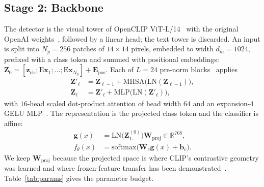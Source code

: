 \documentclass[10pt,journal]{IEEEtran}
\newcommand{\vect}[1]{\boldsymbol{#1}}
\newcommand{\mat}[1]{\mathbf{#1}}
\newcommand{\real}{\mathbb{R}}
\begin{document}
\subsection{Stage 2: Backbone}\label{sec:arch}
The detector is the visual tower of OpenCLIP ViT-L/14~\cite{ilharco2021openclip}
with the original OpenAI weights~\cite{radford2021clip}, followed by a linear
head; the text tower is discarded. An input is split into $N_p=256$ patches of
$14\times14$ pixels, embedded to width $d_m=1024$, prefixed with a class token
and summed with positional embeddings:
$\mat{Z}_0=[\vect{z}_{\mathrm{cls}};\mathrm{E}\vect{x}_1;\dots;\mathrm{E}\vect{x}_{N_p}]
+\mat{E}_{\mathrm{pos}}$. Each of $L=24$ pre-norm
blocks~\cite{vaswani2017attention,dosovitskiy2021vit} applies
\begin{align}
\mat{Z}'_{\ell}&=\mat{Z}_{\ell-1}+\mathrm{MHSA}\big(\mathrm{LN}(\mat{Z}_{\ell-1})\big),\\
\mat{Z}_{\ell}&=\mat{Z}'_{\ell}+\mathrm{MLP}\big(\mathrm{LN}(\mat{Z}'_{\ell})\big),
\end{align}
with $16$-head scaled dot-product attention of head width $64$ and an
expansion-$4$ GELU MLP~\cite{hendrycks2016gelu}. The representation is the
projected class token and the classifier is affine:
\begin{align}
\vect{g}(x)&=\mathrm{LN}\big(\mat{Z}_L^{(0)}\big)\mat{W}_{\mathrm{proj}}\in\real^{768},
\label{eq:head}\\
f_\theta(x)&=\mathrm{softmax}\big(\mat{W}_c\vect{g}(x)+\vect{b}_c\big).
\end{align}
We keep $\mat{W}_{\mathrm{proj}}$ because the projected space is where CLIP's
contrastive geometry was learned and where frozen-feature transfer has been
demonstrated~\cite{ojha2023universal}. Table~\ref{tab:params} gives the
parameter budget.
\end{document}
